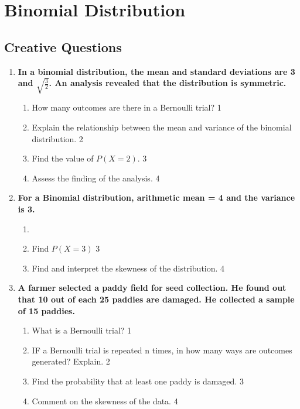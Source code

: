 \documentclass[a4paper,oneside, margin=1.4in]{book}
\begin{document}
\chapter{Binomial Distribution} 
\section{Creative Questions}
  \begin{enumerate}
  
   \item
  \textbf{In a binomial distribution, the mean and standard deviations are 3 and $\sqrt{\frac{3}{2}}$. An analysis revealed that the distribution is symmetric.} 

  
  \begin{enumerate}
     \item How many outcomes are there in a Bernoulli trial?  \hfill 1
    \item Explain the relationship between the mean and variance of the binomial distribution. \hfill 2
    \item  
	Find the value of $P(X=2)$. \hfill 3
    \item
	Assess the finding of the analysis. \hfill 4
  \end{enumerate}
  
   \item
	  \textbf{For a Binomial distribution, arithmetic mean = 4 and the variance is 3.} 
  
  \begin{enumerate}
    \item
    \item  
	Find $P(X = 3)$ \hfill 3
    \item
	Find and interpret the skewness of the distribution. \hfill 4
  \end{enumerate}
  
     \item
	  \textbf{A farmer selected a paddy field for seed collection. He found out that 10 out of each 25 paddies are damaged. He collected a sample of 15 paddies.} 
  
  \begin{enumerate}
    \item
	What is a Bernoulli trial? \hfill 1
    \item
	IF a Bernoulli trial is repeated n times, in how many ways are outcomes 
	generated? Explain. \hfill 2
    \item  
	Find the probability that at least one paddy is damaged. \hfill 3
    \item
	Comment on the skewness of the data. \hfill 4 
	

\end{enumerate}
\end{enumerate}
\end{document}
